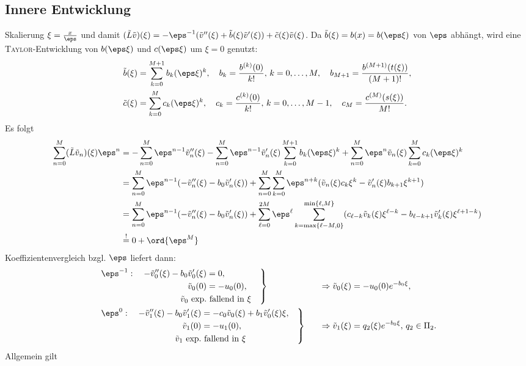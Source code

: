 \subsection*{Innere Entwicklung}
Skalierung $\xi=\frac{x}{\eps}$ und damit $(\tilde L\tilde v)(\xi)=-\eps^{-1}(\tilde v''(\xi)+\tilde b(\xi)\tilde v'(\xi))+\tilde c(\xi)\tilde v(\xi)$.
Da $\tilde b(\xi)=b(x)=b(\eps\xi)$ von $\eps$ abhängt, wird eine \textsc{Taylor}-Entwicklung von $b(\eps\xi)$ und
$c(\eps\xi)$ um $\xi=0$ genutzt:
\begin{align*}
  \tilde b(\xi)
  &%
  =\sum_{k=0}^{M+1}b_k(\eps\xi)^k,\quad
  b_k=\frac{b^{(k)}(0)}{k!},\,k=0,\dots,M,\quad
  b_{M+1}=\frac{b^{(M+1)}(t(\xi))}{(M+1)!},\\
  \tilde c(\xi)
  &%
  =\sum_{k=0}^{M}c_k(\eps\xi)^k,\quad
  c_k=\frac{c^{(k)}(0)}{k!},\,k=0,\dots,M-1,\quad
  c_M=\frac{c^{(M)}(s(\xi))}{M!}.
\end{align*}
Es folgt
\begin{align*}
  \sum_{n=0}^M(\tilde L\tilde v_n)(\xi)\eps^n
  &= -\sum_{n=0}^M\eps^{n-1}\tilde v_n''(\xi)
  -\sum_{n=0}^M\eps^{n-1}\tilde v_n'(\xi)\sum_{k=0}^{M+1}b_k(\eps\xi)^k
  +\sum_{n=0}^M\eps^{n}\tilde v_n(\xi)\sum_{k=0}^{M}c_k(\eps\xi)^k\\
  &= \sum_{n=0}^M\eps^{n-1}(-\tilde v_n''(\xi)-b_0\tilde v_n'(\xi))
  +\sum_{n=0}^M\sum_{k=0}^{M}\eps^{n+k}(\tilde v_n(\xi)c_k\xi^k-\tilde v_n'(\xi)b_{k+1}\xi^{k+1})\\
  &= \sum_{n=0}^M\eps^{n-1}(-\tilde v_n''(\xi)-b_0\tilde v_n'(\xi))
  +\sum_{\ell=0}^{2M}\eps^\ell\sum_{k=\max\{\ell-M,0\}}^{\min\{\ell,M\}}(c_{\ell-k}\tilde v_k(\xi)\xi^{\ell-k}-b_{\ell-k+1}\tilde v_k'(\xi)\xi^{\ell+1-k})\\
  &\stackrel{!}{=}0+\ord{\eps^M}
\end{align*}
Koeffizientenvergleich bzgl. $\eps$ liefert dann:
\begin{align*}
  &\left.
    \begin{aligned}
      \eps^{-1}:\quad-\tilde v''_0(\xi)-b_0\tilde v'_0(\xi) &= 0,\\
      \tilde v_0(0)&=-u_0(0),\\
      \tilde v_0 \mbox{ exp.}&\mbox{ fallend in $\xi$}
    \end{aligned}\quad
  \right\}&\quad\Rightarrow \tilde v_0(\xi)&=-u_0(0)e^{-b_0\xi},\\
  &\left.
    \begin{aligned}
      \eps^{0}:\quad-\tilde v''_1(\xi)-b_0\tilde v'_1(\xi) &= -c_0\tilde v_0(\xi)+b_1\tilde v_0'(\xi)\xi,\\
      \tilde v_1(0)&=-u_1(0),\\
      \tilde v_1 \mbox{ exp.}&\mbox{ fallend in $\xi$}
    \end{aligned}\quad
  \right\}&\quad\Rightarrow \tilde v_1(\xi)&=q_2(\xi)e^{-b_0\xi},\,q_2\in\Pi_2.
\end{align*}
Allgemein gilt

